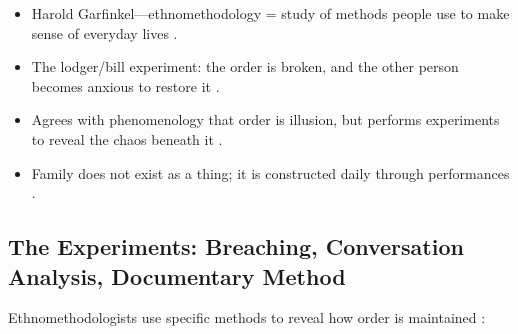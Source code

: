 \begin{QuickRevision}
\begin{itemize}
    \item Harold Garfinkel---ethnomethodology = study of methods people use to make sense of everyday lives .
    \item The lodger/bill experiment: the order is broken, and the other person becomes anxious to restore it .
    \item Agrees with phenomenology that order is illusion, but performs experiments to reveal the chaos beneath it .
    \item Family does not exist as a thing; it is constructed daily through performances .
\end{itemize}
\end{QuickRevision}

\subsection{The Experiments: Breaching, Conversation Analysis, Documentary Method}
Ethnomethodologists use specific methods to reveal how order is maintained :
